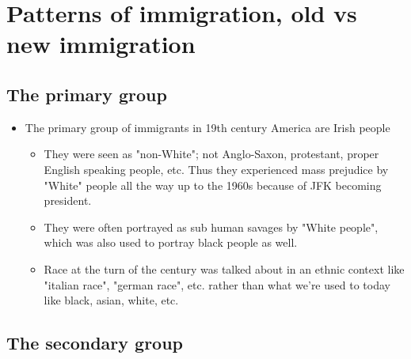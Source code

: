 \documentclass[12pt]{book}
\begin{document}
\section{Patterns of immigration, old vs new immigration}

\subsection{The primary group}
\begin{itemize}
  \item The primary group of immigrants in 19th century America are Irish people
  \begin{itemize}
    \item They were seen as "non-White"; not Anglo-Saxon, protestant, proper English speaking people, etc. Thus they experienced mass prejudice by "White" people all the way up to the 1960s because of JFK becoming president.
    \item They were often portrayed as sub human savages by "White people", which was also used to portray black people as well.
    \item Race at the turn of the century was talked about in an ethnic context like "italian race", "german race", etc. rather than what we're used to today like black, asian, white, etc.
  \end{itemize}
\end{itemize}

\subsection{The secondary group}
\end{document}
